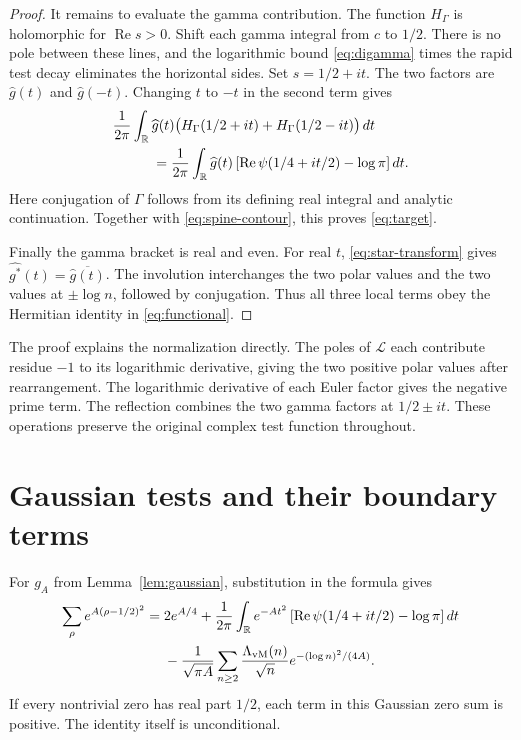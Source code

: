 \begin{proof}
It remains to evaluate the gamma contribution.
The function $H_\Gamma$ is holomorphic for $\operatorname{Re}s>0$.
Shift each gamma integral from $c$ to $1/2$.
There is no pole between these lines, and the logarithmic bound
\eqref{eq:digamma} times the rapid test decay eliminates the horizontal sides.
Set $s=1/2+it$.  The two factors are $\widehat g(t)$ and $\widehat g(-t)$.
Changing $t$ to $-t$ in the second term gives
\begin{align*}
 &\frac1{2\pi}\int_{\mathbb R}\widehat g(t)
         \bigl(H_\Gamma(1/2+it)+H_\Gamma(1/2-it)\bigr)\,dt\\
 &\hspace{1cm}=\frac1{2\pi}\int_{\mathbb R}\widehat g(t)
     \left[\operatorname{Re}\psi(1/4+it/2)-\log\pi\right]dt.
\end{align*}
Here conjugation of $\Gamma$ follows from its defining real integral and
analytic continuation.  Together with \eqref{eq:spine-contour}, this proves
\eqref{eq:target}.

Finally the gamma bracket is real and even.
For real $t$, \eqref{eq:star-transform} gives
$\widehat{g^*}(t)=\overline{\widehat g(t)}$.
The involution interchanges the two polar values and the two values at
$\pm\log n$, followed by conjugation.
Thus all three local terms obey the Hermitian identity in
\eqref{eq:functional}.
\end{proof}

The proof explains the normalization directly.
The poles of $\mathcal L$ each contribute residue $-1$ to its logarithmic
derivative, giving the two positive polar values after rearrangement.
The logarithmic derivative of each Euler factor gives the negative prime
term.  The reflection combines the two gamma factors at $1/2\pm it$.
These operations preserve the original complex test function throughout.

\section{Gaussian tests and their boundary terms}
\label{sec:polynomial-gaussians}

For $g_A$ from Lemma~\ref{lem:gaussian}, substitution in the formula gives
\begin{equation}
\begin{split}
 \sum_\rho e^{A(\rho-1/2)^2}
 ={}&2e^{A/4}
   +\frac1{2\pi}\int_{\mathbb R}e^{-At^2}
      \left[\operatorname{Re}\psi(1/4+it/2)-\log\pi\right]dt\\
 &-\frac1{\sqrt{\pi A}}\sum_{n\geq2}
       \frac{\Lambda_{\rm vM}(n)}{\sqrt n}
                       e^{-(\log n)^2/(4A)}.
\end{split}
\label{eq:gaussian-explicit}
\end{equation}
If every nontrivial zero has real part $1/2$, each term in this Gaussian
zero sum is positive.  The identity itself is unconditional.

